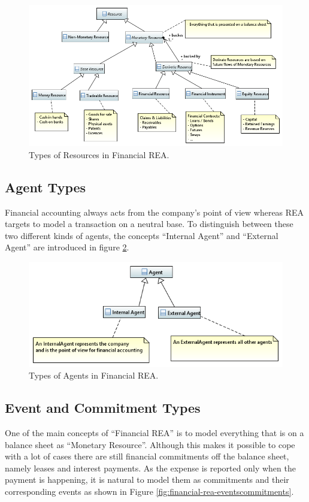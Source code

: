 \documentclass[10pt,paper=a4,parskip]{scrartcl}
\begin{document}
\begin{figure}
\centering
\includegraphics[width=0.8\linewidth]{"Financial REA Resources"}
\caption{Types of Resources in Financial REA.}
\label{fig:financial-rea-resources}
\end{figure}




\subsection{Agent Types}

Financial accounting always acts from the company's point of view whereas REA targets to model a transaction on a neutral base.
To distinguish between these two different kinds of agents, the concepts ``Internal Agent'' and ``External Agent'' are introduced in figure \ref{fig:financial-rea-agents}.

\begin{figure}
\centering
\includegraphics[width=0.8\linewidth]{"Financial REA Agents"}
\caption{Types of Agents in Financial REA.}
\label{fig:financial-rea-agents}
\end{figure}

\subsection{Event and Commitment Types}

One of the main concepts of ``Financial REA'' is to model everything that is on a balance sheet as ``Monetary Resource''.
Although this makes it possible to cope with a lot of cases there are still financial commitments off the balance sheet, namely leases and interest payments.
As the expense is reported only when the payment is happening, it is natural to model them as commitments and their corresponding events as shown in Figure \ref{fig:financial-rea-eventscommitments}.
\end{document}

